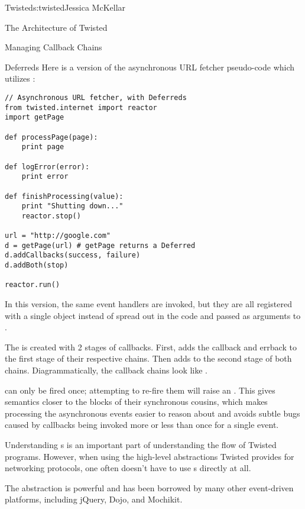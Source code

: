 \begin{aosachapter}{Twisted}{s:twisted}{Jessica McKellar}
\begin{aosasect1}{The Architecture of Twisted}
\begin{aosasect2}{Managing Callback Chains}
\begin{aosasect3}{Deferreds}
Here is a version of the asynchronous URL fetcher pseudo-code which
utilizes :

\begin{verbatim}
// Asynchronous URL fetcher, with Deferreds
from twisted.internet import reactor
import getPage

def processPage(page):
    print page

def logError(error):
    print error

def finishProcessing(value):
    print "Shutting down..."
    reactor.stop()

url = "http://google.com"
d = getPage(url) # getPage returns a Deferred
d.addCallbacks(success, failure)
d.addBoth(stop)

reactor.run()
\end{verbatim}

In this version, the same event handlers are invoked, but they are all
registered with a single  object instead of spread out in
the code and passed as arguments to .

The  is created with 2 stages of callbacks. First,
 adds the  callback and
 errback to the first stage of their respective
chains. Then  adds  to the second
stage of both chains. Diagrammatically, the callback chains look like
.


 can only be fired once; attempting to re-fire them
will raise an . This gives 
semantics closer to the  blocks of their synchronous
cousins, which makes processing the asynchronous events easier to reason about
and avoids subtle bugs caused by callbacks being invoked more or less than once
for a single event.

Understanding s is an important part of understanding
the flow of Twisted programs. However, when using the high-level abstractions
Twisted provides for networking protocols, one often doesn't have to use
s directly at all.

The  abstraction is powerful and has been borrowed by
many other event-driven platforms, including jQuery, Dojo, and Mochikit.

\end{aosasect3}


\end{aosasect2}
\end{aosasect1}
\end{aosachapter}
